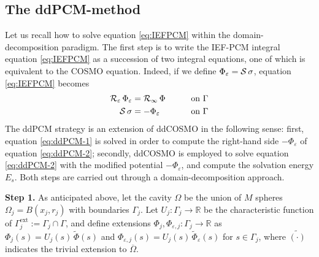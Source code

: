 \subsection{The ddPCM-method}

Let us recall how to solve equation \eqref{eq:IEFPCM} within the domain-decomposition paradigm. The first step is to write the IEF-PCM integral equation \eqref{eq:IEFPCM} as a succession of two integral equations, one of which is equivalent to the COSMO equation\cite{Cances_Librone_PCM}. Indeed, if we define $\Phi_\varepsilon = \mathcal{S} \, \sigma$, equation \eqref{eq:IEFPCM} becomes
\begin{alignat}{3}
\mathcal{R}_\varepsilon \, \Phi_\varepsilon & = \mathcal{R}_\infty \, \Phi \qquad && \text{on }\Gamma  \label{eq:ddPCM-1} \\
\mathcal{S} \, \sigma & = -\Phi_\varepsilon  && \text{on }\Gamma \label{eq:ddPCM-2} 
\end{alignat}
The ddPCM strategy is an extension of ddCOSMO in the following sense: first, equation \eqref{eq:ddPCM-1} is solved in order to compute the right-hand side $-\Phi_\varepsilon$ of equation \eqref{eq:ddPCM-2}; secondly, ddCOSMO is employed to solve equation \eqref{eq:ddPCM-2} with the modified potential $-\Phi_\varepsilon$, and compute the solvation energy $E_s$. Both steps are carried out through a domain-decomposition approach.

{\bf Step 1.} As anticipated above, let the cavity $\Omega$ be the union of $M$ spheres $\Omega_j = B(x_j, r_j)$ with boundaries $\Gamma_j$. Let $U_j: \Gamma_j \to \mathbb{R}$ be the characteristic function of $\Gamma_j^\text{ext}:= \Gamma_j \cap \Gamma$, and define extensions $\Phi_j , \Phi_{\varepsilon,j} : \Gamma_j \to \mathbb{R}$ as  $\Phi_j (s)= U_j(s) \, \widetilde{\Phi}(s)$ and $\Phi_{\varepsilon,j}(s)= U_j(s) \, \widetilde{\Phi}_{\varepsilon}(s)$ for $s \in \Gamma_j$, where $\tilde{(\cdot)}$ indicates the trivial extension to $\overline{\Omega}$.


